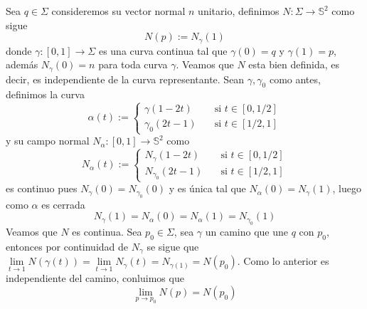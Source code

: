 \documentclass{article}
\begin{document}
\begin{enumerate}
    Sea $q\in\Sigma$ consideremos su vector normal $n$ unitario, definimos 
    $N:\Sigma\to\mathbb{S}^{2}$ como sigue
    \begin{equation*}
        N(p):=N_{\gamma}(1)
    \end{equation*}
    donde $\gamma:[0,1]\to\Sigma$ es una curva continua tal que $\gamma(0)=q$ y $\gamma(1)=p$, 
    además $N_{\gamma}(0)=n$ para toda curva $\gamma$. Veamos que $N$ esta bien definida, es decir,
    es independiente de la curva representante. Sean $\gamma,\gamma_{0}$ como antes, definimos la
    curva
    \begin{equation*}
        \alpha(t):=\begin{cases}
            \gamma(1-2t) &\quad\text{si }t\in[0,1/2] \\
            \gamma_{0}(2t-1) &\quad\text{si }t\in[1/2,1]
        \end{cases}
    \end{equation*}
    y su campo normal $N_{\alpha}:[0,1]\to\mathbb{S}^{2}$ como
    \begin{equation*}
        N_{\alpha}(t):=\begin{cases}
            N_{\gamma}(1-2t) &\quad\text{si }t\in[0,1/2] \\
            N_{\gamma_{0}}(2t-1) &\quad\text{si }t\in[1/2,1]
        \end{cases}
    \end{equation*}
    es continuo pues $N_{\gamma}(0)=N_{\gamma_{0}}(0)$ y es única tal que $N_{\alpha}(0)
    =N_{\gamma}(1)$, luego como $\alpha$ es cerrada
    \begin{equation*}
        N_{\gamma}(1)=N_{\alpha}(0)=N_{\alpha}(1)=N_{\gamma_{0}}(1)
    \end{equation*}
    Veamos que $N$ es continua. Sea $p_{0}\in\Sigma$, sea $\gamma$ un camino que une $q$ con 
    $p_{0}$, entonces por continuidad de $N_{\gamma}$ se sigue que $\lim\limits_{t\to 1}
    N(\gamma(t))=\lim\limits_{t\to 1}N_{\gamma}(t)=N_{\gamma(1)}=N(p_{0})$. Como lo anterior es 
    independiente del camino, conluimos que
    \begin{equation*}
        \lim\limits_{p\to p_{0}}N(p)=N(p_{0})
    \end{equation*}
\end{enumerate}
\end{document}
